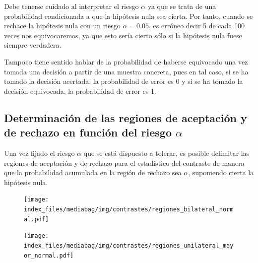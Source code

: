 \documentclass[
  a4paper,
]{scrreport}
\theoremstyle{definition}
\theoremstyle{definition}
\theoremstyle{plain}
\theoremstyle{remark}
\begin{document}
Debe tenerse cuidado al interpretar el riesgo \(\alpha\) ya que se trata
de una probabilidad condicionada a que la hipótesis nula sea cierta. Por
tanto, cuando se rechace la hipótesis nula con un riesgo
\(\alpha=0.05\), es erróneo decir 5 de cada 100 veces nos equivocaremos,
ya que esto sería cierto sólo si la hipótesis nula fuese siempre
verdadera.

Tampoco tiene sentido hablar de la probabilidad de haberse equivocado
una vez tomada una decisión a partir de una muestra concreta, pues en
tal caso, si se ha tomado la decisión acertada, la probabilidad de error
es 0 y si se ha tomado la decisión equivocada, la probabilidad de error
es 1.

\hypertarget{determinaciuxf3n-de-las-regiones-de-aceptaciuxf3n-y-de-rechazo-en-funciuxf3n-del-riesgo-alpha}{%
\subsection{\texorpdfstring{Determinación de las regiones de aceptación
y de rechazo en función del riesgo
\(\alpha\)}{Determinación de las regiones de aceptación y de rechazo en función del riesgo \textbackslash alpha}}\label{determinaciuxf3n-de-las-regiones-de-aceptaciuxf3n-y-de-rechazo-en-funciuxf3n-del-riesgo-alpha}}

Una vez fijado el riesgo \(\alpha\) que se está dispuesto a tolerar, es
posible delimitar las regiones de aceptación y de rechazo para el
estadístico del contraste de manera que la probabilidad acumulada en la
región de rechazo sea \(\alpha\), suponiendo cierta la hipótesis nula.

\begin{figure}

{\centering \texttt{[image: index\_files/mediabag/img/contrastes/regiones\_bilateral\_normal.pdf]}

}

\end{figure}

\begin{figure}

{\centering \texttt{[image: index\_files/mediabag/img/contrastes/regiones\_unilateral\_mayor\_normal.pdf]}

}

\end{figure}
\end{document}
